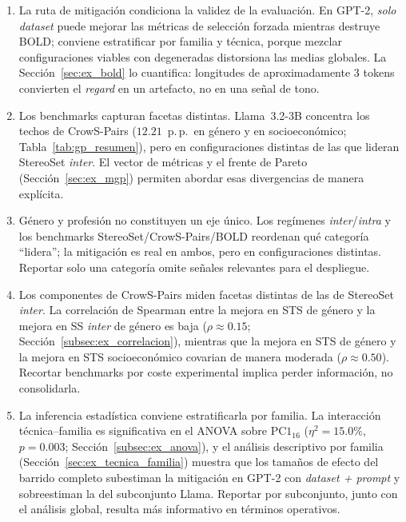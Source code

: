\documentclass[12pt,a4paper]{report}
\newcommand{\interTecFam}{técnica--familia}
\newcommand{\PConeSixteen}{\ensuremath{\mathrm{PC1}_{16}}}
\begin{document}
\begin{enumerate}[leftmargin=*]
  \item La ruta de mitigación condiciona la validez de la evaluación. En GPT-2, \textit{solo dataset} puede mejorar las métricas de selección forzada mientras destruye BOLD; conviene estratificar por familia y técnica, porque mezclar configuraciones viables con degeneradas distorsiona las medias globales. La Sección~\ref{sec:ex_bold} lo cuantifica: longitudes de aproximadamente 3 tokens convierten el \textit{regard} en un artefacto, no en una señal de tono.

  \item Los benchmarks capturan facetas distintas. Llama~3.2-3B concentra los techos de CrowS-Pairs ($12.21$~p.\,p.\ en género y en socioeconómico; Tabla~\ref{tab:gp_resumen}), pero en configuraciones distintas de las que lideran StereoSet \textit{inter}. El vector de métricas y el frente de Pareto (Sección~\ref{sec:ex_mgp}) permiten abordar esas divergencias de manera explícita.

  \item Género y profesión no constituyen un eje único. Los regímenes \textit{inter}/\textit{intra} y los benchmarks StereoSet/CrowS-Pairs/BOLD reordenan qué categoría ``lidera''; la mitigación es real en ambos, pero en configuraciones distintas. Reportar solo una categoría omite señales relevantes para el despliegue.

  \item Los componentes de CrowS-Pairs miden facetas distintas de las de StereoSet \textit{inter}. La correlación de Spearman entre la mejora en STS de género y la mejora en SS \textit{inter} de género es baja ($\rho\approx 0.15$; Sección~\ref{subsec:ex_correlacion}), mientras que la mejora en STS de género y la mejora en STS socioeconómico covarian de manera moderada ($\rho\approx 0.50$). Recortar benchmarks por coste experimental implica perder información, no consolidarla.

  \item La inferencia estadística conviene estratificarla por familia. La interacción \interTecFam{} es significativa en el ANOVA sobre \PConeSixteen{} ($\eta^2=15.0\%$, $p=0.003$; Sección~\ref{subsec:ex_anova}), y el análisis descriptivo por familia (Sección~\ref{sec:ex_tecnica_familia}) muestra que los tamaños de efecto del barrido completo subestiman la mitigación en GPT-2 con \textit{dataset + prompt} y sobreestiman la del subconjunto Llama. Reportar por subconjunto, junto con el análisis global, resulta más informativo en términos operativos.
\end{enumerate}
\end{document}
